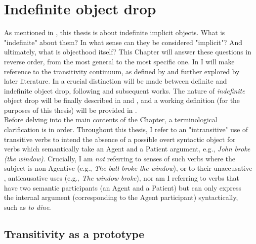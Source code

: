 \setchapterpreamble[u]{\margintoc}
\chapter{Indefinite object drop} %

As mentioned in , this thesis is about indefinite implicit objects. What is "indefinite" about them? In what sense can they be considered "implicit"? And ultimately, what is objecthood itself? This Chapter will answer these questions in reverse order, from the most general to the most specific one. In  I will make reference to the transitivity continuum, as defined by \textcite{HopperThompson1980} and further explored by later literature. In  a crucial distinction will be made between definite and indefinite object drop, following \textcite{Fillmore1986} and subsequent works. The nature of \textit{indefinite} object drop will be finally described in  and , and a working definition (for the purposes of this thesis) will be provided in .\\
Before delving into the main contents of the Chapter, a terminological clarification is in order. Throughout this thesis, I refer to an "intransitive" use of transitive verbs to intend the absence of a possible overt syntactic object for verbs which semantically take an Agent and a Patient argument, e.g., \textit{John broke (the window)}. Crucially, I am \textit{not} referring to senses of such verbs where the subject is non-Agentive (e.g., \textit{The ball broke the window}), or to their unaccusative \parencite{perlmutter1978impersonal}, anticausative uses (e.g., \textit{The window broke}), nor am I referring to verbs that have two semantic participants (an Agent and a Patient) but can only express the internal argument (corresponding to the Agent participant) syntactically, such as \textit{to dine}.


\section{Transitivity as a prototype} 

